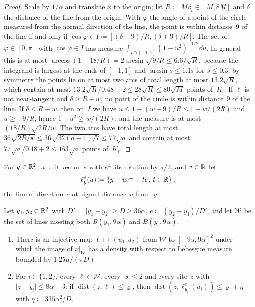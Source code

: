 \documentclass[11pt,letterpaper]{article}
\DeclareMathOperator{\dist}{dist}
\newcommand{\cW}{\mathcal W}
\begin{document}
\begin{proof}
Scale by $1/\alpha$ and translate $x$ to the origin; let $R\coloneqq M\beta_i\in[M,8M]$ and $\delta$ the distance of the line from the origin. With $\varphi$ the angle of a point of the circle measured from the normal direction of the line, the point is within distance~$9$ of the line if and only if $\cos\varphi\in I\coloneqq[(\delta-9)/R,(\delta+9)/R]$. The set of $\varphi\in[0,\pi]$ with $\cos\varphi\in I$ has measure $\int_{I\cap[-1,1]}(1-u^2)^{-1/2}\dd u$. In general this is at most $\arccos(1-18/R)=2\arcsin\sqrt{9/R}\le6.6/\sqrt R$, because the integrand is largest at the ends of $[-1,1]$ and $\arcsin s\le1.1s$ for $s\le0.3$; by symmetry the points lie on at most two arcs of total length at most $13.2\sqrt R$, which contain at most $13.2\sqrt R/0.48+2\le28\sqrt R\le80\sqrt M$ points of~$K_i$. If $\ell$ is not near-tangent and $\delta\ge R+w$, no point of the circle is within distance~$9$ of the line. If $\delta\le R-w$, then on~$I$ we have $u\le1-(w-9)/R\le1-w/(2R)$ and $u\ge-9/R$, hence $1-u^2\ge w/(2R)$, and the measure is at most $(18/R)\sqrt{2R/w}$. The two arcs have total length at most $36\sqrt{2R/w}\le36\sqrt{32(a-1)/7}\le77\sqrt a$ and contain at most $77\sqrt a/0.48+2\le163\sqrt a$ points of~$K_i$.
\end{proof}

For $y\in\mathbb R^2$, a unit vector~$e$ with $e^\perp$ its rotation by $\pi/2$, and $u\in\mathbb R$ let
\begin{equation*}
  \ell^{e}_{y}(u)\coloneqq\{y+ue^\perp+te\colon t\in\mathbb R\}\,,
\end{equation*}
the line of direction~$e$ at signed distance~$u$ from~$y$.

\begin{lemma}
\label{lem:pair}
Let $y_1,y_2\in\mathbb R^2$ with $D'\coloneqq\lvert y_1-y_2\rvert\ge D\ge36\alpha$, $e\coloneqq(y_2-y_1)/D'$, and let $\cW$ be the set of lines meeting both $B(y_1,9\alpha)$ and $B(y_2,9\alpha)$.
\begin{enumerate}
  \item There is an injective map $\ell\mapsto(u_1,u_2)$ from $\cW$ to $[-9\alpha,9\alpha]^2$ under which the image of $\nu\vert_{\cW}$ has a density with respect to Lebesgue measure bounded by $1.25\mu/(\pi D)$.
  \item For $i\in\{1,2\}$, every $\ell\in\cW$, every $\varrho\le2$ and every site~$z$ with $\lvert z-y_i\rvert\le8\alpha+3$: if $\dist(z,\ell)\le\varrho$, then $\dist(z,\ell^e_{y_i}(u_i))\le\varrho+\eta$ with $\eta\coloneqq335\alpha^2/D$.
\end{enumerate}
\end{lemma}
\end{document}

